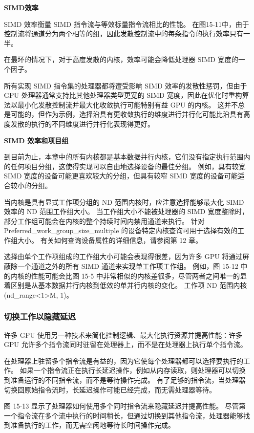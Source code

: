 \textbf{SIMD效率}

SIMD 效率衡量 SIMD 指令流与等效标量指令流相比的性能。 在图15-11中，由于控制流将通道分为两个相等的组，因此发散控制流中的每条指令的执行效率只有一半。

在最坏的情况下，对于高度发散的内核，效率可能会降低处理器 SIMD 宽度的一个因子。

所有实现 SIMD 指令集的处理器都将遭受影响 SIMD 效率的发散性惩罚，但由于 GPU 处理器通常支持比其他处理器类型更宽的 SIMD 宽度，因此在优化时重构算法以最小化发散控制流并最大化收敛执行可能特别有益 GPU 的内核。 这并不总是可能的，但作为示例，选择沿具有更收敛执行的维度进行并行化可能比沿具有高度发散的执行的不同维度进行并行化表现得更好。

\textbf{SIMD 效率和项目组}

到目前为止，本章中的所有内核都是基本数据并行内核，它们没有指定执行范围内的任何项目分组，这使得实现可以自由地选择设备的最佳分组。 例如，具有较宽 SIMD 宽度的设备可能更喜欢较大的分组，但具有较窄 SIMD 宽度的设备可能适合较小的分组。

当内核是具有显式工作项分组的 ND 范围内核时，应注意选择能够最大化 SIMD 效率的 ND 范围工作组大小。 当工作组大小不能被处理器的 SIMD 宽度整除时，部分工作组可能会在内核的整个持续时间内禁用通道来执行。 针对 Preferred\_work\_group\_size\_multiple 的设备特定内核查询可用于选择有效的工作组大小。 有关如何查询设备属性的详细信息，请参阅第 12 章。

选择由单个工作项组成的工作组大小可能会表现得很差，因为许多 GPU 将通过屏蔽除一个通道之外的所有 SIMD 通道来实现单工作项工作组。 例如，图 15-12 中的内核的性能可能会比图 15-5 中非常相似的内核差很多，尽管两者之间唯一的显着区别是从基本数据并行内核到低效的单并行内核的变化。 工作项 ND 范围内核 (nd\_range<1>{M, 1})。

\subsubsection{切换工作以隐藏延迟}
许多 GPU 使用另一种技术来简化控制逻辑、最大化执行资源并提高性能：许多 GPU 允许多个指令流同时驻留在处理器上，而不是在处理器上执行单个指令流。

在处理器上驻留多个指令流是有益的，因为它使每个处理器都可以选择要执行的工作。 如果一个指令流正在执行长延迟操作，例如从内存读取，则处理器可以切换到准备运行的不同指令流，而不是等待操作完成。 有了足够的指令流，当处理器切换回原始指令流时，长延迟操作可能已经完成，而无需处理器等待。

图 15-13 显示了处理器如何使用多个同时指令流来隐藏延迟并提高性能。 尽管第一个指令流在多个流中执行的时间稍长，但通过切换到其他指令流，处理器能够找到准备执行的工作，而无需空闲地等待长时间操作完成。

